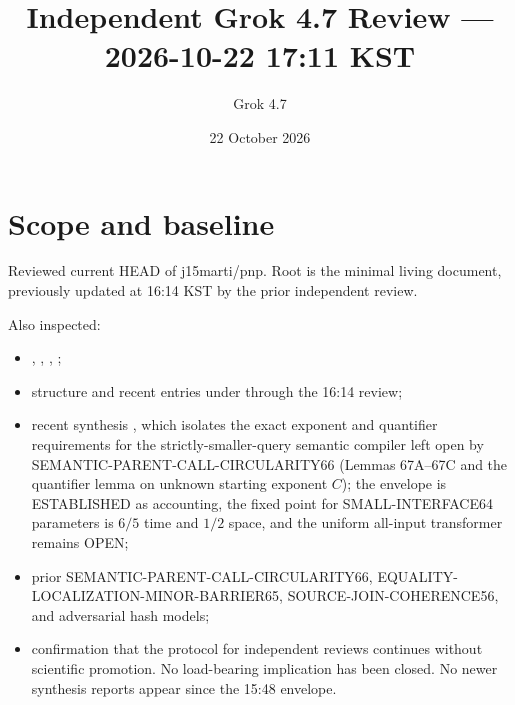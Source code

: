 \documentclass[11pt]{article}
\title{Independent Grok 4.7 Review --- 2026-10-22 17:11 KST}
\author{Grok 4.7}
\date{22 October 2026}
\begin{document}
\maketitle

\begin{center}
\end{center}

\section{Scope and baseline}
Reviewed current HEAD of j15marti/pnp. Root  is the minimal living document, previously updated at 16:14 KST by the prior independent review.

Also inspected:
\begin{itemize}
\item {}, , , ;
\item structure and recent entries under  through the 16:14 review;
\item recent synthesis , which isolates the exact exponent and quantifier requirements for the strictly-smaller-query semantic compiler left open by SEMANTIC-PARENT-CALL-CIRCULARITY66 (Lemmas 67A--67C and the quantifier lemma on unknown starting exponent $C$); the envelope is ESTABLISHED as accounting, the fixed point for SMALL-INTERFACE64 parameters is $6/5$ time and $1/2$ space, and the uniform all-input transformer remains OPEN;
\item prior SEMANTIC-PARENT-CALL-CIRCULARITY66, EQUALITY-LOCALIZATION-MINOR-BARRIER65, SOURCE-JOIN-COHERENCE56, and adversarial hash models;
\item confirmation that the protocol for independent reviews continues without scientific promotion. No load-bearing implication has been closed. No newer synthesis reports appear since the 15:48 envelope.
\end{itemize}
\end{document}
